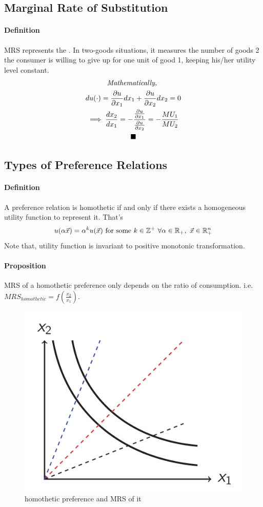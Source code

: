 \documentclass{article}
\begin{document}
		\subsection{Marginal Rate of Substitution}
			\paragraph{Definition} MRS represents the . In two-goods situations, it measures the number of goods 2 the consumer is willing to give up for one unit of good 1, keeping his/her utility level constant.
			\begin{multline*}
				\emph{Mathematically, } \\
				du(\cdot) = \frac{\partial{u}}{\partial{x_1}}dx_1 + \frac{\partial{u}}{\partial{x_2}}dx_2 = 0\\
				\implies \frac{d{x_2}}{d{x_1}} = - \frac{\frac{\partial{u}}{\partial{x_1}}}{\frac{\partial{u}}{\partial{x_2}}} = - \frac{MU_1}{MU_2} \\
				\blacksquare
			\end{multline*}
		
		\subsection{Types of Preference Relations}
			\paragraph{Definition} A preference relation is homothetic if and only if there exists a homogeneous utility function to represent it. That's
			\[
				u(\alpha \vec{x}) = \alpha^k u(\vec{x})\ \text{{for some }} k \in \mathbb{Z}^+\ \forall \alpha \in \mathbb{R}_+,\ \vec{x} \in \mathbb{R}^n_+
			\]
			Note that, utility function is invariant to positive monotonic transformation.
			
			\paragraph{Proposition} MRS of a homothetic preference only depends on the ratio of consumption. i.e. $MRS_{homothetic} = f(\frac{x_2}{x_1})$.
			
			\begin{figure}[h]
				\centering
				\includegraphics[width=0.35\linewidth]{figure/lec2_2}
				\caption{homothetic preference and MRS of it}
			\end{figure}
			
\end{document}
